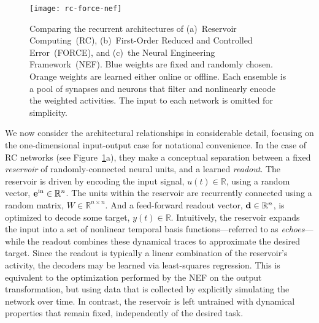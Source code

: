 \begin{figure}
  \centering
  \texttt{[image: rc-force-nef]}
  \caption{ \label{fig:architectures}
    Comparing the recurrent architectures of (a)~Reservoir Computing~(RC), (b)~First-Order Reduced and Controlled Error~(FORCE), and (c)~the Neural Engineering Framework~(NEF).
    Blue weights are fixed and randomly chosen.
    Orange weights are learned either online or offline.
    Each ensemble is a pool of synapses and neurons that filter and nonlinearly encode the weighted activities.
    The input to each network is omitted for simplicity.
  }
\end{figure}


We now consider the architectural relationships in considerable detail, focusing on the one-dimensional input-output case for notational convenience.
In the case of RC networks (see Figure~\ref{fig:architectures}a), they make a conceptual separation between a fixed {\it reservoir} of randomly-connected neural units, and a learned {\it readout}.
The reservoir is driven by encoding the input signal, $u(t) \in \mathbb{R}$, using a random vector, $\mathbf{e}^\text{in} \in \mathbb{R}^n$.
The units within the reservoir are recurrently connected using a random matrix, $W \in \mathbb{R}^{n \times n}$.
And a feed-forward readout vector, $\mathbf{d} \in \mathbb{R}^{n}$, is optimized to decode some target, $y(t) \in \mathbb{R}$.
Intuitively, the reservoir expands the input into a set of nonlinear temporal basis functions---referred to as {\it echoes}---while the readout combines these dynamical traces to approximate the desired target.
Since the readout is typically a linear combination of the reservoir's activity, the decoders may be learned via least-squares regression.
This is equivalent to the optimization performed by the NEF on the output transformation, but using data that is collected by explicitly simulating the network over time.
In contrast, the reservoir is left untrained with dynamical properties that remain fixed, independently of the desired task.

